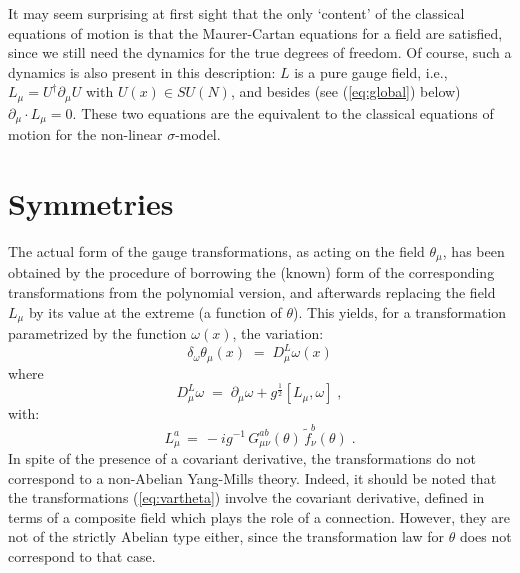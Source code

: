 \documentclass[a4paper,12pt]{article}
\begin{document}
It may seem surprising at first sight that the only `content' of the
classical equations of motion is that the Maurer-Cartan equations for
a field are satisfied, since we still need the dynamics for the true
degrees of freedom. Of course, such a dynamics is also present in this
description: $L$ is a pure gauge field, i.e., $L_\mu = U^\dagger
\partial_\mu U$ with $U(x) \in SU(N)$, and besides (see
(\ref{eq:global}) below) $\partial_\mu \cdot L_\mu = 0$. These two
equations are the equivalent to the classical equations of motion for
the non-linear $\sigma$-model.

\section{Symmetries}\label{sec:gauge}
The actual form of the gauge transformations, as acting on the field
$\theta_\mu$, has been obtained by the procedure of borrowing the
(known) form of the corresponding transformations from the polynomial
version, and afterwards replacing the field $L_\mu$ by its value at
the extreme (a function of $\theta$). This yields, for a
transformation parametrized by the function $\omega(x)$, the
variation:
\begin{equation}\label{eq:vartheta}
\delta_\omega \theta_\mu(x) \;=\; D^L_\mu \omega(x)
\end{equation}
where
\begin{equation}\label{eq:defdl}
D^L_\mu \omega \;=\; \partial_\mu \omega + g^{\frac{1}{2}} [L_\mu,\omega] \;,  
\end{equation}
with: 
\begin{equation}\label{eq:loft}
L_\mu^a \,=\, -i g^{-1} \, G_{\mu\nu}^{ab}(\theta)\, {\tilde f}_\nu^b (\theta)\;.
\end{equation}
In spite of the presence of a covariant derivative, the
transformations do not correspond to a non-Abelian Yang-Mills theory.
Indeed, it should be noted that the transformations
(\ref{eq:vartheta}) involve the covariant derivative, defined in terms
of a composite field which plays the role of a connection.  However,
they are not of the strictly Abelian type either, since the
transformation law for $\theta$ does not correspond to that case.
\end{document}
